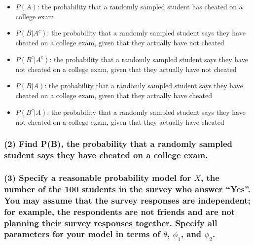 \documentclass[]{article}
\begin{document}
\begin{itemize}
\item
  \(P(A)\): the probability that a randomly sampled student has cheated
  on a college exam
\item
  \(P(B | A^c)\): the probability that a randomly sampled student says
  they have cheated on a college exam, given that they actually have not
  cheated
\item
  \(P(B^c | A^c)\): the probability that a randomly sampled student says
  they have not cheated on a college exam, given that they actually have
  not cheated
\item
  \(P(B | A)\): the probability that a randomly sampled student says
  they have cheated on a college exam, given that they actually have
  cheated
\item
  \(P(B^c | A)\): the probability that a randomly sampled student says
  they have not cheated on a college exam, given that they actually have
  cheated
\end{itemize}

\hypertarget{find-pb-the-probability-that-a-randomly-sampled-student-says-they-have-cheated-on-a-college-exam.}{%
\subsubsection{(2) Find P(B), the probability that a randomly sampled
student says they have cheated on a college
exam.}\label{find-pb-the-probability-that-a-randomly-sampled-student-says-they-have-cheated-on-a-college-exam.}}

\hypertarget{specify-a-reasonable-probability-model-for-x-the-number-of-the-100-students-in-the-survey-who-answer-yes.-you-may-assume-that-the-survey-responses-are-independent-for-example-the-respondents-are-not-friends-and-are-not-planning-their-survey-responses-together.-specify-all-parameters-for-your-model-in-terms-of-theta-phi_1-and-phi_2.}{%
\subsubsection{\texorpdfstring{(3) Specify a reasonable probability
model for \(X\), the number of the 100 students in the survey who answer
``Yes''. You may assume that the survey responses are independent; for
example, the respondents are not friends and are not planning their
survey responses together. Specify all parameters for your model in
terms of \(\theta\), \(\phi_1\), and
\(\phi_2\).}{(3) Specify a reasonable probability model for X, the number of the 100 students in the survey who answer ``Yes''. You may assume that the survey responses are independent; for example, the respondents are not friends and are not planning their survey responses together. Specify all parameters for your model in terms of \textbackslash{}theta, \textbackslash{}phi\_1, and \textbackslash{}phi\_2.}}\label{specify-a-reasonable-probability-model-for-x-the-number-of-the-100-students-in-the-survey-who-answer-yes.-you-may-assume-that-the-survey-responses-are-independent-for-example-the-respondents-are-not-friends-and-are-not-planning-their-survey-responses-together.-specify-all-parameters-for-your-model-in-terms-of-theta-phi_1-and-phi_2.}}
\end{document}
